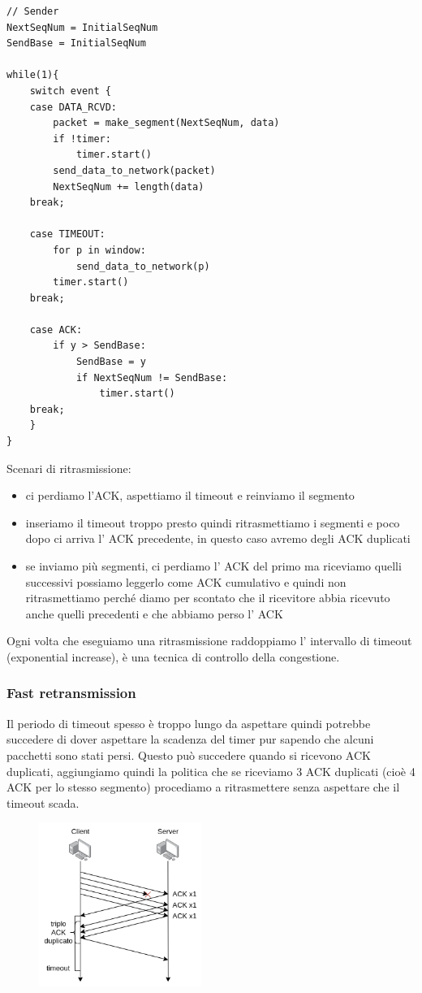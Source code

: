 \begin{verbatim}
// Sender
NextSeqNum = InitialSeqNum
SendBase = InitialSeqNum

while(1){
    switch event {
    case DATA_RCVD:
        packet = make_segment(NextSeqNum, data)
        if !timer:
            timer.start()
        send_data_to_network(packet)
        NextSeqNum += length(data)
    break;
    
    case TIMEOUT:
        for p in window:
            send_data_to_network(p)
        timer.start()
    break;
    
    case ACK:
        if y > SendBase:
            SendBase = y
            if NextSeqNum != SendBase:
                timer.start()
    break;
    }
}    
\end{verbatim}

Scenari di ritrasmissione:
\begin{itemize}
    \item ci perdiamo l'ACK, aspettiamo il timeout e reinviamo il segmento

    \item inseriamo il timeout troppo presto quindi ritrasmettiamo i segmenti e poco dopo ci arriva l' ACK precedente, in questo caso avremo degli ACK duplicati

    \item se inviamo più segmenti, ci perdiamo l' ACK del primo ma riceviamo quelli successivi possiamo leggerlo come ACK cumulativo e quindi non ritrasmettiamo perché diamo per scontato che il ricevitore abbia ricevuto anche quelli precedenti e che abbiamo perso l' ACK
\end{itemize}
Ogni volta che eseguiamo una ritrasmissione raddoppiamo l' intervallo di timeout (exponential increase), è una tecnica di controllo della congestione.

\subsubsection{Fast retransmission}
Il periodo di timeout spesso è troppo lungo da aspettare quindi potrebbe succedere di dover aspettare la scadenza del timer pur sapendo che alcuni pacchetti sono stati persi.
Questo può succedere quando si ricevono ACK duplicati, aggiungiamo quindi la politica che se riceviamo 3 ACK duplicati (cioè 4 ACK per lo stesso segmento) procediamo a ritrasmettere senza aspettare che il timeout scada.
\begin{figure}[H]
    \centering
    \includegraphics[width=200px]{images/6_Trasporto/fast_retransmit.png}
\end{figure}

